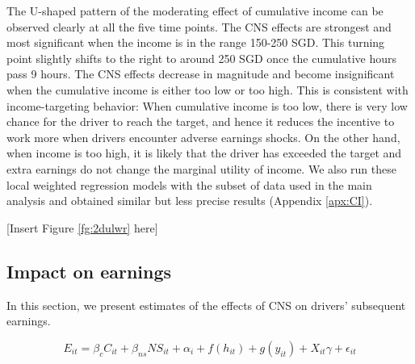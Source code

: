 \documentclass[reviewmode,AEJ]{AEA}
\begin{document}
The U-shaped pattern of the moderating effect of cumulative income can be observed clearly at all the five time points. The CNS effects are strongest and most significant when the income is in the range 150-250 SGD. This turning point slightly shifts to the right to around 250 SGD once the cumulative hours pass 9 hours. The CNS effects decrease in magnitude and become insignificant when the cumulative income is either too low or too high. This is consistent with income-targeting behavior: When cumulative income is too low, there is very low chance for the driver to reach the target, and hence it reduces the incentive to work more when drivers encounter adverse earnings shocks. On the other hand, when income is too high, it is likely that the driver has exceeded the target and extra earnings do not change the marginal utility of income. We also run these local weighted regression models with the subset of data used in the main analysis and obtained similar but less precise results (Appendix \ref{apx:CI}).


\begin{center}
	[Insert Figure \ref{fg:2dulwr} here]
\end{center}

\subsection{Impact on earnings}
In this section, we present estimates of the effects of CNS on drivers' subsequent earnings.

\begin{equation}
\label{eq:outcomes}
E_{it} = \beta_c C_{it} + \beta_{ns} {NS}_{it} + \alpha_i + f(h_{it}) + g(y_{it}) + X_{it}\gamma  + \epsilon_{it}
\end{equation}
\end{document}
